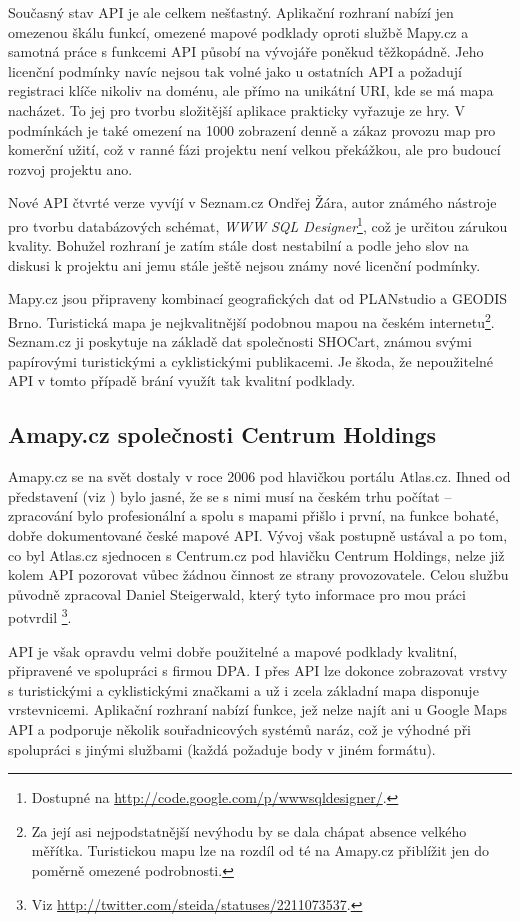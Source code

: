 Současný stav API je ale celkem nešťastný. Aplikační rozhraní nabízí
jen omezenou škálu funkcí, omezené mapové podklady oproti službě
Mapy.cz a samotná práce s funkcemi API působí na vývojáře poněkud
těžkopádně. Jeho licenční podmínky navíc nejsou tak volné jako u
ostatních API a požadují registraci klíče nikoliv na doménu, ale
přímo na unikátní URI, kde se má mapa nacházet. To jej pro tvorbu
složitější aplikace prakticky vyřazuje ze hry. V podmínkách je také
omezení na 1000 zobrazení denně a zákaz provozu map pro komerční
užití, což v ranné fázi projektu není velkou překážkou, ale pro
budoucí rozvoj projektu ano.

Nové API čtvrté verze vyvíjí v Seznam.cz Ondřej Žára, autor známého
nástroje pro tvorbu databázových schémat, {\it WWW SQL
Designer}\footnote{Dostupné na
\url{http://code.google.com/p/wwwsqldesigner/}.}, což je určitou zárukou kvality. Bohužel rozhraní je zatím stále dost
nestabilní a podle jeho slov na diskusi k projektu ani jemu stále
ještě nejsou známy nové licenční podmínky.

Mapy.cz jsou připraveny kombinací geografických dat od PLANstudio a
GEODIS Brno. Turistická mapa je nej\-kvalitnější podobnou mapou na českém
internetu\footnote{Za její asi nejpodstatnější nevýhodu by se dala
chápat absence velkého měřítka. Turistickou mapu lze na rozdíl od té
na Amapy.cz přiblížit jen do poměrně omezené podrobnosti.}. Seznam.cz
ji poskytuje na základě dat společnosti SHOCart, známou svými
papírovými turistickými a cyklistickými publikacemi. Je škoda, že
nepoužitelné API v tomto případě brání využít tak kvalitní podklady.

\subsection{Amapy.cz společnosti Centrum Holdings}
Amapy.cz se na svět dostaly v roce 2006 pod hlavičkou portálu
Atlas.cz. Ihned od představení (viz \cite{amapy}) bylo jasné, že se s
nimi musí na českém trhu počítat -- zpracování bylo profesionální a spolu s mapami přišlo
i první, na funkce bohaté, dobře dokumentované české mapové API. Vývoj
však postupně ustával a po tom, co byl Atlas.cz sjednocen s
Centrum.cz pod hlavičku Centrum Holdings, nelze již kolem API
pozorovat vůbec žádnou činnost ze strany provozovatele. Celou službu
původně zpracoval Daniel Steigerwald, který tyto informace pro mou
práci potvrdil
\footnote{Viz \url{http://twitter.com/steida/statuses/2211073537}.}.

API je však opravdu velmi dobře použitelné a mapové podklady
kvalitní, připravené ve spolupráci s firmou DPA. I přes API lze
dokonce zobrazovat vrstvy s turistickými a cyklistickými značkami a už i
zcela základní mapa disponuje vrstevnicemi. Aplikační rozhraní nabízí
funkce, jež nelze najít ani u Google Maps API a podporuje několik
souřadnicových systémů naráz, což je výhodné při spolupráci s jinými
službami (každá požaduje body v jiném formátu).

